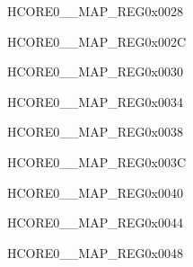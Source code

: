 \begin{register}{H}{CORE0\_\_MAP\_REG}{0x0028}\label{regdesc:CORE0LPGPIOINTMAPREG}
\end{register}\vspace{-3em}


\begin{register}{H}{CORE0\_\_MAP\_REG}{0x002C}\label{regdesc:CORE0LPI2CINTMAPREG}
\end{register}\vspace{-3em}


\begin{register}{H}{CORE0\_\_MAP\_REG}{0x0030}\label{regdesc:CORE0LPI2SINTMAPREG}
\end{register}\vspace{-3em}


\begin{register}{H}{CORE0\_\_MAP\_REG}{0x0034}\label{regdesc:CORE0LPSPIINTMAPREG}
\end{register}\vspace{-3em}


\begin{register}{H}{CORE0\_\_MAP\_REG}{0x0038}\label{regdesc:CORE0LPTOUCHINTMAPREG}
\end{register}\vspace{-3em}


\begin{register}{H}{CORE0\_\_MAP\_REG}{0x003C}\label{regdesc:CORE0LPTSENSINTMAPREG}
\end{register}\vspace{-3em}


\begin{register}{H}{CORE0\_\_MAP\_REG}{0x0040}\label{regdesc:CORE0LPUARTINTMAPREG}
\end{register}\vspace{-3em}


\begin{register}{H}{CORE0\_\_MAP\_REG}{0x0044}\label{regdesc:CORE0LPEFUSEINTMAPREG}
\end{register}\vspace{-3em}


\begin{register}{H}{CORE0\_\_MAP\_REG}{0x0048}\label{regdesc:CORE0LPSWINTMAPREG}
\end{register}\vspace{-3em}


